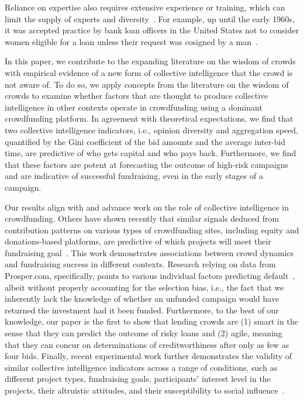 \documentclass[sigconf]{acmart}
\begin{document}
Reliance on expertise also requires extensive experience or training, which can limit the supply of experts and diversity~\cite{uzzi1999embeddedness,Cohn2014}. For example, up until the early 1960s, it was accepted practice by bank loan officers in the United States not to consider women eligible for a loan unless their request was cosigned by a man~\cite{bystrom2018women}.  

In this paper, we contribute to the expanding literature on the wisdom of crowds with empirical evidence of a new form of collective intelligence that the crowd is not aware of. To do so, we apply concepts from the literature on the wisdom of crowds to examine whether factors that are thought to produce collective intelligence in other contexts operate in crowdfunding using a dominant crowdfunding platform. In agreement with theoretical expectations, we find that two collective intelligence indicators, i.e., opinion diversity and aggregation speed, quantified by the Gini coefficient of the bid amounts and the average inter-bid time, are predictive of who gets capital and who pays back. Furthermore, we find that these factors are potent at forecasting the outcome of high-risk campaigns and are indicative of successful fundraising, even in the early stages of a campaign.

Our results align with and advance work on the role of collective intelligence in crowdfunding. Others have shown recently that similar signals deduced from contribution patterns on various types of crowdfunding sites, including equity and donations-based platforms, are predictive of which projects will meet their fundraising goal~\cite{dambanemuya2021multi}. This work demonstrates associations between crowd dynamics and fundraising success in different contexts. Research relying on data from Prosper.com, specifically, points to various individual factors predicting default~\cite{serrano2015determinants,emekter2015evaluating,canfield2018determinants,iyer2015screening,dambanemuya2019harnessing}, albeit without properly accounting for the selection bias, i.e., the fact that we inherently lack the knowledge of whether an unfunded campaign would have returned the investment had it been funded. Furthermore, to the best of our knowledge, our paper is the first to show that lending crowds are (1) smart in the sense that they can predict the outcome of risky loans and (2) agile, meaning that they can concur on determinations of creditworthiness after only as few as four bids. Finally, recent experimental work further demonstrates the validity of similar collective intelligence indicators across a range of conditions, such as different project types, fundraising goals, participants' interest level in the projects, their altruistic attitudes, and their susceptibility to social influence~\cite{dambanemuyaarxiv}. 
\end{document}
